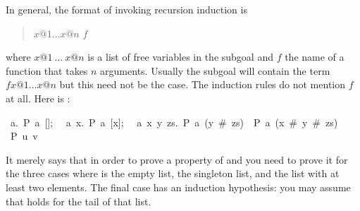 \begin{isabellebody}
\begin{isamarkuptext}
In general, the format of invoking recursion induction is
\begin{quote}
 $x@1 \dots x@n$  $f$
\end{quote}%
where $x@1~\dots~x@n$ is a list of free variables in the subgoal and $f$ the
name of a function that takes $n$ arguments. Usually the subgoal will
contain the term $f x@1 \dots x@n$ but this need not be the case. The
induction rules do not mention $f$ at all. Here is :
\begin{isabelle}
{\isasymlbrakk}~{\isasymAnd}a.~P~a~[];\isanewline
~~{\isasymAnd}a~x.~P~a~[x];\isanewline
~~{\isasymAnd}a~x~y~zs.~P~a~(y~\#~zs)~{\isasymLongrightarrow}~P~a~(x~\#~y~\#~zs){\isasymrbrakk}\isanewline
{\isasymLongrightarrow}~P~u~v%
\end{isabelle}
It merely says that in order to prove a property  of  and
 you need to prove it for the three cases where  is the
empty list, the singleton list, and the list with at least two elements.
The final case has an induction hypothesis:  you may assume that 
holds for the tail of that list.
%
\end{isamarkuptext}%
\isamarkuptrue%
%
\isadelimtheory
%
\endisadelimtheory
%
\isatagtheory
%
\endisatagtheory
{\isafoldtheory}%
%
\isadelimtheory
%
\endisadelimtheory
\end{isabellebody}%
